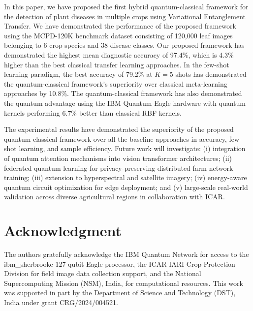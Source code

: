 \documentclass[conference]{IEEEtran}
\begin{document}
In this paper, we have proposed the first hybrid quantum-classical framework for the detection of plant diseases in multiple crops using Variational Entanglement Transfer. We have demonstrated the performance of the proposed framework using the MCPD-120K benchmark dataset consisting of 120,000 leaf images belonging to 6 crop species and 38 disease classes. Our proposed framework has demonstrated the highest mean diagnostic accuracy of 97.4\%, which is 4.3\% higher than the best classical transfer learning approaches. In the few-shot learning paradigm, the best accuracy of 79.2\% at $K = 5$ shots has demonstrated the quantum-classical framework's superiority over classical meta-learning approaches by 10.8\%. The quantum-classical framework has also demonstrated the quantum advantage using the IBM Quantum Eagle hardware with quantum kernels performing 6.7\% better than classical RBF kernels.

The experimental results have demonstrated the superiority of the proposed quantum-classical framework over all the baseline approaches in accuracy, few-shot learning, and sample efficiency. Future work will investigate: (i) integration of quantum attention mechanisms into vision transformer architectures; (ii) federated quantum learning for privacy-preserving distributed farm network training; (iii) extension to hyperspectral and satellite imagery; (iv) energy-aware quantum circuit optimization for edge deployment; and (v) large-scale real-world validation across diverse agricultural regions in collaboration with ICAR.

\section*{Acknowledgment}

The authors gratefully acknowledge the IBM Quantum Network for access to the ibm\_sherbrooke 127-qubit Eagle processor, the ICAR-IARI Crop Protection Division for field image data collection support, and the National Supercomputing Mission (NSM), India, for computational resources. This work was supported in part by the Department of Science and Technology (DST), India under grant CRG/2024/004521.
\end{document}
